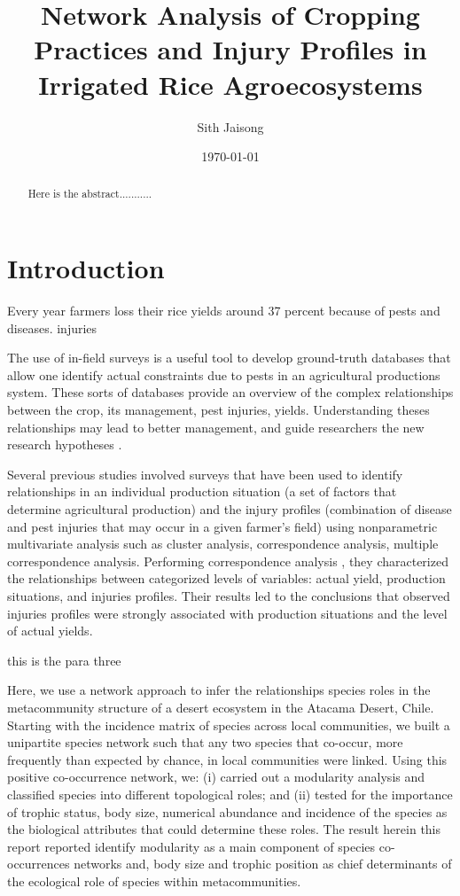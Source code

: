 \documentclass[a4paper]{article}
\title{Network Analysis of Cropping Practices and Injury Profiles in Irrigated Rice Agroecosystems}
\author{Sith Jaisong}
\date{\today}
\begin{document}
\maketitle

\begin{abstract}
Here is the abstract...........
\end{abstract}

\section*{Introduction}
Every year farmers loss their rice yields around 37 percent because of pests and diseases. injuries

The use of in-field surveys is a useful tool to develop ground-truth databases that allow one identify actual constraints due to pests in an agricultural productions system. These sorts of databases provide an overview of the complex relationships between the crop, its management, pest injuries, yields. Understanding theses relationships may lead to better management, and guide researchers the new research hypotheses .

Several previous studies involved surveys that have been used to identify relationships in an individual production situation (a set of factors that determine agricultural production) and the injury profiles (combination of disease and pest injuries that may occur in a given farmer's field) using nonparametric multivariate analysis such as cluster analysis, correspondence analysis, multiple correspondence analysis. Performing correspondence analysis , they characterized the relationships between categorized levels of variables: actual yield, production situations, and injuries profiles. Their results led to the conclusions that observed injuries profiles were strongly associated with production situations and the level of actual yields.

this is the para three

Here, we use a network approach to infer the relationships species roles in the metacommunity structure of a desert ecosystem in the Atacama Desert, Chile. Starting with the incidence matrix of species across local communities, we built a unipartite species network such that any two species that co-occur, more frequently than expected by chance, in local communities were linked. Using this positive co-occurrence network, we: (i) carried out a modularity analysis and classified species into different topological roles; and (ii) tested for the importance of trophic status, body size, numerical abundance and incidence of the species as the biological attributes that could determine these roles. The result herein this report  reported identify modularity as a main component of species co-occurrences networks and, body size and trophic position as chief determinants of the ecological role of species within metacommunities.
\end{document}
